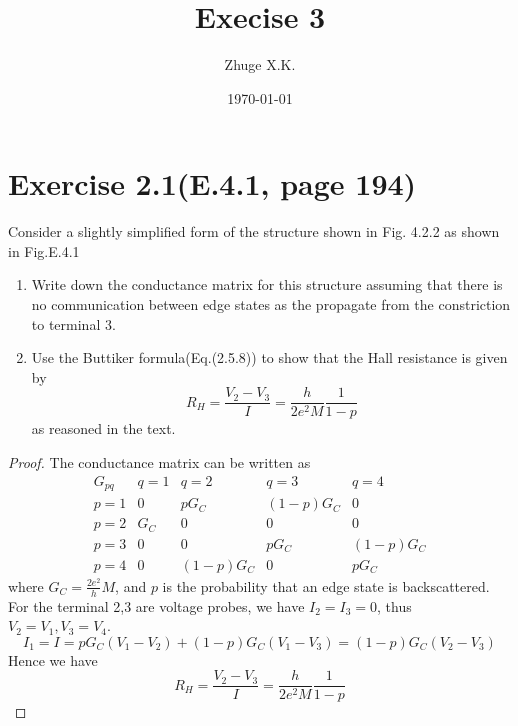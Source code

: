\documentclass[11pt,a4paper]{article}
\title{Execise 3}
\author{Zhuge X.K.}
\date{\today}
\theoremstyle{plain}
\theoremstyle{definition}
\theoremstyle{remark}
\begin{document}
\maketitle
\section*{Exercise 2.1(E.4.1, page 194)}
Consider a slightly simplified form of the structure shown in Fig. 4.2.2 as shown in Fig.E.4.1
\begin{enumerate}[label=(\alph*)]
    \item Write down the conductance matrix for this structure assuming that there is no communication between edge states as the propagate from the constriction to terminal 3.
    \item Use the Buttiker formula(Eq.(2.5.8)) to show that the Hall resistance is given by
    \[
        R_H = \frac{V_2 - V_3}{I} = \frac{h}{2e^2 M}\frac{1}{1-p}
    \]
    as reasoned in the text.
\end{enumerate}

\begin{proof}
    The conductance matrix can be written as
    \begin{equation}
        \begin{matrix}
            G_{pq} & q = 1 & q = 2 & q = 3 & q = 4 \\
            p = 1 & 0 & pG_C & (1-p)G_C & 0 \\
            p = 2 & G_C & 0 & 0 & 0 \\
            p = 3 & 0 & 0 & pG_C & (1-p)G_C \\
            p = 4 & 0 & (1-p)G_C & 0 & pG_C
        \end{matrix}
    \end{equation}
    where $G_C = \frac{2e^2}{h}M$, and $p$ is the probability that an edge state is backscattered. For the terminal 2,3 are voltage probes, we have $I_2 = I_3 = 0$, thus $V_2 = V_1, V_3 = V_4$.
    \begin{equation}
        I_1 = I = pG_C (V_1 - V_2) + (1-p) G_C(V_1 - V_3) = (1-p)G_C(V_2 - V_3)
    \end{equation}
    Hence we have
    \begin{equation}
        R_H = \frac{V_2 - V_3}{I} = \frac{h}{2e^2 M}\frac{1}{1-p}
    \end{equation}
\end{proof}
\end{document}
